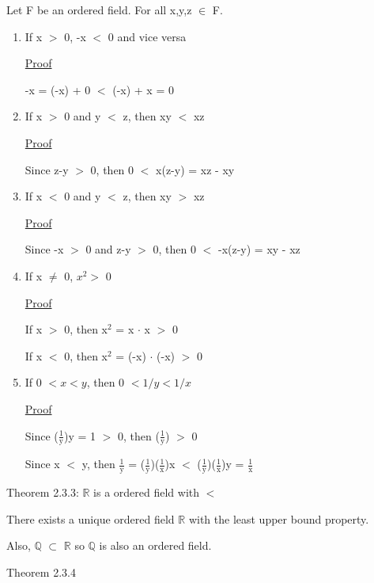 	\qquad Let F be an ordered field. For all x,y,z $\in$ F.
	\begin{enumerate}[label=(\alph*), leftmargin=2cm]
		\item If x $>$ 0, -x $<$ 0 and vice versa
	
			{ \color{magenta} \underline{Proof} } 
	
				-x = (-x) + 0 $<$ (-x) + x = 0

		\item If x $>$ 0 and y $<$ z, then xy $<$ xz
	
			{ \color{magenta} \underline{Proof} } 
		
				Since z-y $>$ 0, then 0 $<$ x(z-y) = xz - xy

		\item If x $ < $ 0 and y $ < $ z, then xy $ > $ xz

			{ \color{magenta} \underline{Proof} } 
		
				Since -x $>$ 0 and z-y $>$ 0, then 0 $<$ -x(z-y) = xy - xz
	
		\item If x $\neq$ 0, $x^2 > $ 0

			{ \color{magenta} \underline{Proof} } 
		
				If x $>$ 0, then x$^\text{2}$ = x $\cdot$ x $>$ 0

				If x $<$ 0, then x$^\text{2}$ = (-x) $\cdot$ (-x) $>$ 0
	
		\item If 0 $< x < y$, then 0 $< 1/y < 1/x$

			{ \color{magenta} \underline{Proof} } 
		
				Since ($\frac{1}{\text{y}}$)y = 1 $>$ 0, then ($\frac{1}{\text{y}}$) $>$ 0

				Since x $<$ y, then $\frac{1}{\text{y}}$
				= ($\frac{1}{\text{y}}$)($\frac{1}{\text{x}}$)x
				$<$ ($\frac{1}{\text{y}}$)($\frac{1}{\text{x}}$)y = $\frac{1}{\text{x}}$ 
	\end{enumerate}

{\color{red} Theorem 2.3.3: $\mathbb{R}$ is a ordered field with $<$ }

	\qquad There exists a unique ordered field $ \mathbb{R} $ with the least upper bound property.

	\qquad Also, $ \mathbb{Q} $  $\subset$ $ \mathbb{R} $ so $\mathbb{Q}$ is also an ordered field. \\

\newpage

{\color{red} Theorem 2.3.4}


